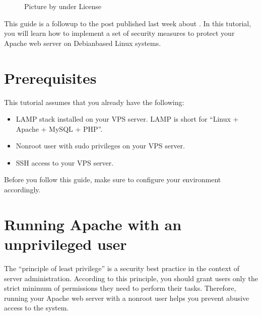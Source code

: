 \documentclass[a4paper,10pt,english,openany,oneside]{sphinxmanual}
\begin{document}
\begin{sloppypar}
\begin{figure}[H]
\noindent{}
\caption{Picture by \sphinxfootnotemark[15] under \sphinxfootnotemark[16] License}\label{\detokenize{hardening-apache:id1}}\end{figure}
%
\begin{footnotetext}[15]\label{\thesphinxscope.15}%
\sphinxAtStartFootnote
{}
%
\end{footnotetext}\ignorespaces %
\begin{footnotetext}[16]\label{\thesphinxscope.16}%
\sphinxAtStartFootnote
{}
%
\end{footnotetext}\ignorespaces 
\sphinxAtStartPar
This guide is a follow\sphinxhyphen{}up to the post published last week about {\hyperref[\detokenize{joomla-to-vps::doc}]{}}. In this tutorial, you will learn how to implement a set of security measures to protect your Apache web server on Debian\sphinxhyphen{}based Linux systems.


\section{Prerequisites}
\label{\detokenize{hardening-apache:prerequisites}}
\sphinxAtStartPar
This tutorial assumes that you already have the following:
\begin{itemize}
\item {} 
\sphinxAtStartPar
LAMP stack installed on your VPS server. LAMP is short for “Linux + Apache + MySQL + PHP”.

\item {} 
\sphinxAtStartPar
Non\sphinxhyphen{}root user with sudo privileges on your VPS server.

\item {} 
\sphinxAtStartPar
SSH access to your VPS server.

\end{itemize}

\sphinxAtStartPar
Before you follow this guide, make sure to configure your environment accordingly.


\section{Running Apache with an unprivileged user}
\label{\detokenize{hardening-apache:running-apache-with-an-unprivileged-user}}
\sphinxAtStartPar
The “principle of least privilege” is a security best practice in the context of server administration. According to this principle, you should grant users only the strict minimum of permissions they need to perform their tasks. Therefore, running your Apache web server with a non\sphinxhyphen{}root user helps you prevent abusive access to the system.


\end{sloppypar}
\end{document}
